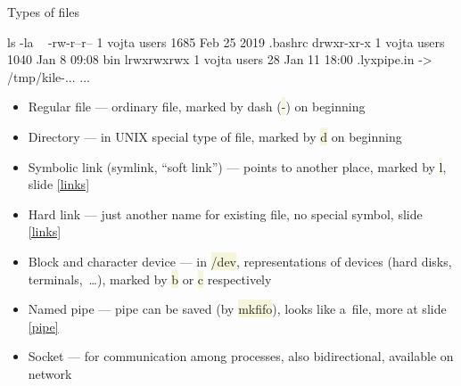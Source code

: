 \documentclass[compress, ucs, xelatex, 11pt, xcolor=svgnames, aspectratio=169,
	hyperref={
		bookmarks=true,
		unicode=true,
		colorlinks=true,
		pdftitle={Linux, command line and MetaCentrum},
		plainpages=false,
		pdfauthor={Vojtech Zeisek},
		pdfsubject={Course about use of Linux command line, writing shell scripts and using MetaCentrum of CESNET},
		pdfcreator={XeLaTeX},
		pdfkeywords={Linux, GNU, BASH, shell, command line, MetaCentrum},
		linkcolor=DarkRed, %
		anchorcolor=DarkBlue, %
		citecolor=Indigo, %
		filecolor=NavyBlue, %
		menucolor=DarkMagenta, %
		urlcolor=DarkBlue, %
		pdftex},
	url={hyphens, lowtilde} %
	]{beamer}
\renewcommand{\texttt}[1]{\colorbox{Beige}{{\ttfamily #1}}}
\begin{document}
\begin{frame}[fragile]{Types of files}
	\begin{bashcode}
    ls -la ~
    -rw-r--r-- 1 vojta users 1685 Feb 25  2019 .bashrc
    drwxr-xr-x 1 vojta users 1040 Jan  8 09:08 bin
    lrwxrwxrwx 1 vojta users   28 Jan 11 18:00 .lyxpipe.in -> /tmp/kile-...
    ...
	\end{bashcode}
	\vfill
	\begin{itemize}
		\item Regular file --- ordinary file, marked by dash (\texttt{-}) on beginning
		\item Directory --- in UNIX special type of file, marked by \texttt{d} on beginning
		\item Symbolic link (symlink, \enquote{soft link}) --- points to another place, marked by \texttt{l}, slide \ref{links}
		\item Hard link --- just another name for existing file, no special symbol, slide \ref{links}
		\item Block and character device --- in \texttt{/dev}, representations of devices (hard disks, terminals,~\ldots), marked by \texttt{b} or \texttt{c} respectively
		\item Named pipe --- pipe can be saved (by \texttt{mkfifo}), looks like a~file, more at slide \ref{pipe}
		\item Socket --- for communication among processes, also bidirectional, available on network
	\end{itemize}
\end{frame}
\end{document}
